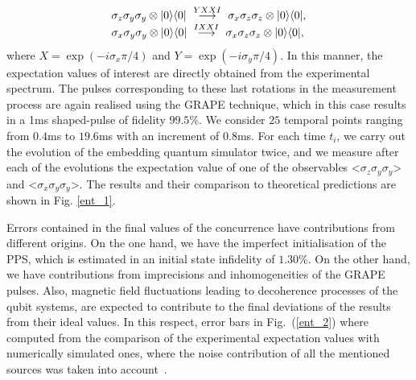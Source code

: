 \documentclass[10pt,nofootinbib,notitlepage,twocolumn,superscriptaddress]{revtex4-1}
\theoremstyle{plain}
\theoremstyle{definition}
\newcommand{\bra}[1]{\mbox{$\langle #1|$}}
\newcommand{\ket}[1]{\ensuremath{|#1\rangle}}
\begin{document}
\begin{equation}
\begin{array}{l}
\sigma_z\sigma_y\sigma_y \otimes \ket{0}\bra{0}~ \stackrel{\large YXXI}{\longrightarrow}~\sigma_x\sigma_z\sigma_z \otimes \ket{0}\bra{0},\\
\sigma_x\sigma_y\sigma_y \otimes \ket{0}\bra{0}~  \stackrel{\large IXXI}{\longrightarrow}~\sigma_x\sigma_z\sigma_z \otimes \ket{0}\bra{0},
\end{array}
\label{E0E1}
\end{equation}
where $X=\exp(-i\sigma_x\pi/4)$ and $Y=\exp(-i\sigma_y\pi/4)$. In this manner, the expectation values of interest are directly obtained from the experimental spectrum. The pulses corresponding to these last rotations in the measurement process are again realised using the GRAPE technique, which in this case results in a 1ms shaped-pulse of fidelity $99.5\%$. We consider $25$ temporal points ranging from $0.4$ms to $19.6$ms with an increment of $0.8$ms. For each time $t_i$, we carry out the evolution of the embedding quantum simulator  twice, and we measure after each of the evolutions the expectation value of one of the observables <$\sigma_z\sigma_y\sigma_y$> and <$\sigma_x\sigma_y\sigma_y$>. The results and their comparison to theoretical predictions are shown in Fig. \ref{ent_1}.

Errors contained in the final values of the concurrence have contributions from different origins. On the one hand, we have the imperfect initialisation of the PPS, which is estimated in an initial state infidelity of $1.30\%$. On the other hand, we have contributions from imprecisions and inhomogeneities of the GRAPE pulses. Also, magnetic field fluctuations leading to decoherence processes of the qubit systems, are expected to contribute to the final deviations of the results from their ideal values. In this respect, error bars in Fig.~(\ref{ent_2}) where computed from the comparison of the experimental expectation values with numerically simulated ones, where the noise contribution of all the mentioned sources was taken into account~\cite{sma}.
\end{document}
